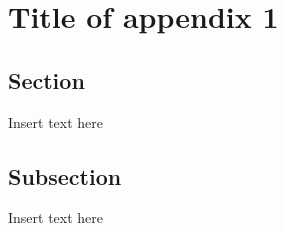 \section{Title of appendix 1}\label{app:appendix_a}

\subsection{Section}\label{app:appendix_a_sect}


Insert text here


\subsection{Subsection}\label{app:appendix_a_subsect}



Insert text here

